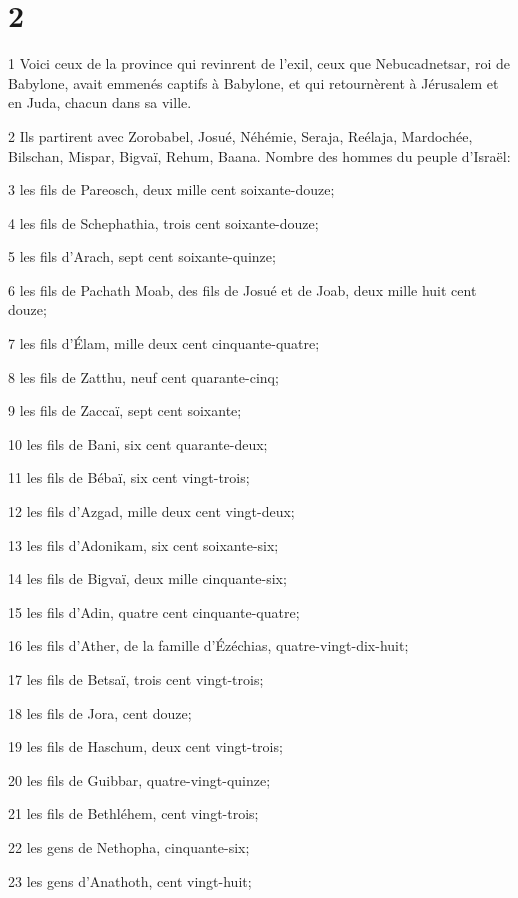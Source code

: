 \chapter{2}

\par 1 Voici ceux de la province qui revinrent de l'exil, ceux que Nebucadnetsar, roi de Babylone, avait emmenés captifs à Babylone, et qui retournèrent à Jérusalem et en Juda, chacun dans sa ville.
\par 2 Ils partirent avec Zorobabel, Josué, Néhémie, Seraja, Reélaja, Mardochée, Bilschan, Mispar, Bigvaï, Rehum, Baana. Nombre des hommes du peuple d'Israël:
\par 3 les fils de Pareosch, deux mille cent soixante-douze;
\par 4 les fils de Schephathia, trois cent soixante-douze;
\par 5 les fils d'Arach, sept cent soixante-quinze;
\par 6 les fils de Pachath Moab, des fils de Josué et de Joab, deux mille huit cent douze;
\par 7 les fils d'Élam, mille deux cent cinquante-quatre;
\par 8 les fils de Zatthu, neuf cent quarante-cinq;
\par 9 les fils de Zaccaï, sept cent soixante;
\par 10 les fils de Bani, six cent quarante-deux;
\par 11 les fils de Bébaï, six cent vingt-trois;
\par 12 les fils d'Azgad, mille deux cent vingt-deux;
\par 13 les fils d'Adonikam, six cent soixante-six;
\par 14 les fils de Bigvaï, deux mille cinquante-six;
\par 15 les fils d'Adin, quatre cent cinquante-quatre;
\par 16 les fils d'Ather, de la famille d'Ézéchias, quatre-vingt-dix-huit;
\par 17 les fils de Betsaï, trois cent vingt-trois;
\par 18 les fils de Jora, cent douze;
\par 19 les fils de Haschum, deux cent vingt-trois;
\par 20 les fils de Guibbar, quatre-vingt-quinze;
\par 21 les fils de Bethléhem, cent vingt-trois;
\par 22 les gens de Nethopha, cinquante-six;
\par 23 les gens d'Anathoth, cent vingt-huit;

